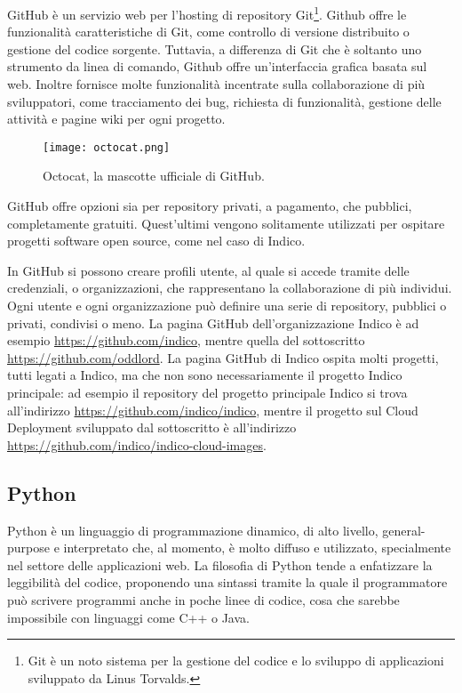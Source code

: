             GitHub è un servizio web per l'hosting di repository Git\footnote{Git è un noto sistema per la gestione del codice e lo sviluppo di applicazioni sviluppato da Linus Torvalds.}. Github offre le funzionalità caratteristiche di Git, come controllo di versione distribuito o gestione del codice sorgente. Tuttavia, a differenza di Git che è soltanto uno strumento da linea di comando, Github offre un'interfaccia grafica basata sul web. Inoltre fornisce molte funzionalità incentrate sulla collaborazione di più sviluppatori, come tracciamento dei bug, richiesta di funzionalità, gestione delle attività e pagine wiki per ogni progetto.
            
        	\begin{figure}[h!]
        		\begin{center}
        			\texttt{[image: octocat.png]}
        		\end{center}
        		\caption[Octocat]{Octocat, la mascotte ufficiale di GitHub.}
        		\label{fig:octocat}
        	\end{figure}
        	
        	GitHub offre opzioni sia per repository privati, a pagamento, che pubblici, completamente gratuiti. Quest'ultimi vengono solitamente utilizzati per ospitare progetti software open source, come nel caso di Indico.
        	
        	In GitHub si possono creare profili utente, al quale si accede tramite delle credenziali, o organizzazioni, che rappresentano la collaborazione di più individui. Ogni utente e ogni organizzazione può definire una serie di repository, pubblici o privati, condivisi o meno. La pagina GitHub dell'organizzazione Indico è ad esempio \url{https://github.com/indico}, mentre quella del sottoscritto \url{https://github.com/oddlord}. La pagina GitHub di Indico ospita molti progetti, tutti legati a Indico, ma che non sono necessariamente il progetto Indico principale: ad esempio il repository del progetto principale Indico si trova all'indirizzo \url{https://github.com/indico/indico}, mentre il progetto sul Cloud Deployment sviluppato dal sottoscritto è all'indirizzo \url{https://github.com/indico/indico-cloud-images}.
    
        \subsection{Python} \label{subsec:p;sl;python}
        
            Python è un linguaggio di programmazione dinamico, di alto livello, general-purpose e interpretato che, al momento, è molto diffuso e utilizzato, specialmente nel settore delle applicazioni web. La filosofia di Python tende a enfatizzare la leggibilità del codice, proponendo una sintassi tramite la quale il programmatore può scrivere programmi anche in poche linee di codice, cosa che sarebbe impossibile con linguaggi come C++ o Java. \cite{wiki:python}
        
